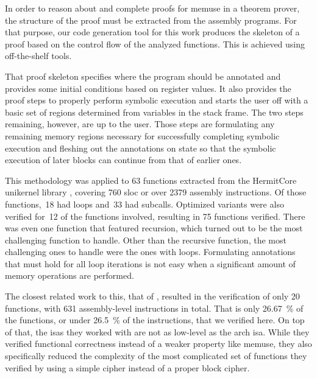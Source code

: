In order to reason about and complete proofs for \gls{memuse} in a theorem prover, the structure of the proof must be extracted from the assembly programs.
For that purpose, our code generation tool for this work produces the skeleton of a proof based on the control flow of the analyzed functions.
This is achieved using off-the-shelf tools.

That proof skeleton specifies where the program should be annotated and provides some initial conditions based on register values.
It also provides the proof steps to properly perform symbolic execution and starts the user off with a basic set of regions determined from variables in the stack frame.
The two steps remaining, however, are up to the user.
Those steps are formulating any remaining memory regions necessary for successfully completing symbolic execution and fleshing out the annotations on state so that the symbolic execution of later blocks can continue from that of earlier ones.

This methodology was applied to \num{63} functions extracted from the HermitCore \autocite{lankes2016hermitcore} unikernel library \autocite{madhavapeddy2014unikernels}, covering \num{760} \ac{sloc} or over \num{2379} assembly instructions.
Of those functions,~\num{18} had loops and~\num{33} had subcalls.
Optimized variants were also verified for~\num{12} of the functions involved, resulting in \num{75} functions verified.
There was even one function that featured recursion, which turned out to be the most challenging function to handle.
Other than the recursive function, the most challenging ones to handle were the ones with loops.
Formulating annotations that must hold for all loop iterations is not easy when a significant amount of memory operations are performed.

The closest related work to this, that of \textcite{matthews2006verification}, resulted in the verification of only \num{20} functions, with \num{631} assembly-level instructions in total.
That is only \SI{26.67}{\percent} of the functions, or under \SI{26.5}{\percent} of the instructions, that we verified here.
On top of that, the \acp{isa} they worked with are not as low-level as the \gls{arch} \ac{isa}.
While they verified functional correctness instead of a weaker property like \gls{memuse}, they also specifically reduced the complexity of the most complicated set of functions they verified by using a simple  cipher instead of a proper block cipher.

